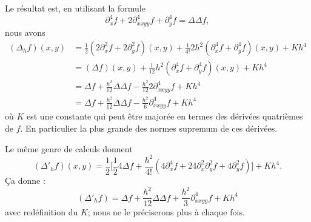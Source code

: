 Le résultat est, en utilisant la formule
\begin{equation}
	\partial^4_xf+2\partial_{xxyy}^4f+\partial^4_yf=\Delta\Delta f,
\end{equation}
nous avons
\begin{subequations}
	\begin{align}
		(\Delta_hf)(x,y) & =\frac{ 1 }{2}(2\partial_x^2f+2\partial_y^2f)(x,y)+\frac{1}{ 4! }2h^2(\partial^4_xf+\partial_y^4f)(x,y)+Kh^4 \\
		                 & =(\Delta f)(x,y)+\frac{1}{ 12 }h^2(\partial_x^4f+\partial_y^4f)(x,y)+Kh^4                                    \\
		                 & =\Delta f+\frac{ h^2 }{ 12 }\Delta\Delta f-\frac{ h^2 }{ 12 }2\partial^4_{xxyy}f+Kh^4                        \\
		                 & =\Delta f+\frac{ h^2 }{ 12 }\Delta\Delta f-\frac{ h^2 }{ 6 }\partial^4_{xxyy}f+Kh^4
	\end{align}
\end{subequations}
où \( K\) est une constante qui peut être majorée en termes des dérivées quatrièmes de \( f\). En particulier la plus grande des normes supremum de ces dérivées.

Le même genre de calculs donnent
\begin{equation}
	(\Delta'_hf)(x,y)=\frac{ 1 }{2}\Big[  \frac{ 1 }{2}4\Delta f+\frac{h^2}{ 4! }(4\partial_x^4f+24\partial_x^2\partial_y^2f+4\partial_y^2f)   \Big]+Kh^4.
\end{equation}
Ça donne :
\begin{equation}
	(\Delta'_hf)=\Delta f+\frac{ h^2 }{ 12 }\Delta\Delta f+\frac{ h^2 }{ 3 }\partial^4_{xxyy}f+Kh^4
\end{equation}
avec redéfinition du \( K\); nous ne le préciserons plus à chaque fois.


